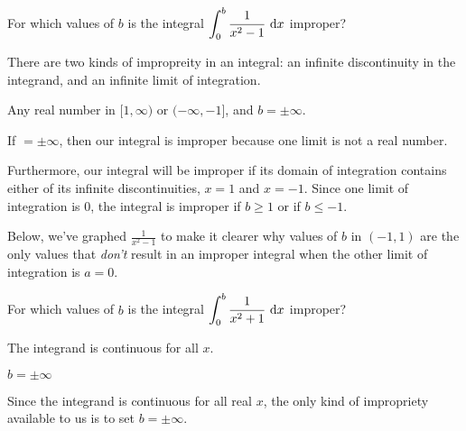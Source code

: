 %
%
\subsection*{\Conceptual}
\begin{Mquestion}
For which values of $b$ is the integral
$\displaystyle\int_0^b \frac{1}{x^2-1}~\mathrm{d}x$ improper?
\end{Mquestion}
\begin{hint}
There are two kinds of impropreity in an integral: an infinite discontinuity in the integrand, and an infinite limit of integration.
\end{hint}
\begin{answer}
Any real number in $[1,\infty)$ or $(-\infty,-1]$, and $b = \pm \infty$.
\end{answer}
\begin{solution}
If $ = \pm \infty$, then our integral is improper because one limit is not a real number.

Furthermore, our integral will be improper if its domain of integration contains either of its infinite discontinuities, $x=1$ and $x=-1$. Since one limit of integration is 0, the integral is improper if $b \geq 1$ or if $b \leq -1$.

Below, we've graphed $\frac{1}{x^2-1}$ to make it clearer why values of $b$ in $(-1,1)$ are the only values that \emph{don't} result in an improper integral when the other limit of integration is $a=0$.

\begin{center}
\end{center}
\end{solution}
\begin{Mquestion}
For which values of $b$ is the integral
$\displaystyle\int_0^b \frac{1}{x^2+1}~\mathrm{d}x$ improper?
\end{Mquestion}
\begin{hint}
The integrand is continuous for all $x$.
\end{hint}
\begin{answer}
$b = \pm\infty$
\end{answer}
\begin{solution}
Since the integrand is continuous for all real $x$, the only kind of impropriety available to us is to set $b = \pm\infty$.
\end{solution}

